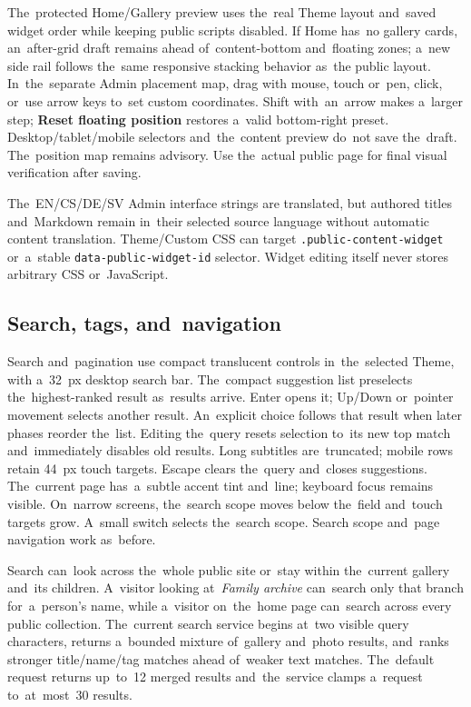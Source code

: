 \documentclass[11pt,a4paper]{article}
\newcommand{\ui}[1]{\textbf{#1}}
\begin{document}
The~protected Home/Gallery preview uses the~real Theme layout and~saved widget
order while keeping public scripts disabled. If Home has~no gallery cards,
an~after-grid draft remains ahead of~content-bottom and~floating zones; a~new
side rail follows the~same responsive stacking behavior as~the public layout.
In~the~separate Admin placement map, drag with mouse, touch or~pen, click,
or~use arrow keys to~set custom coordinates. Shift with~an~arrow makes a~larger
step; \ui{Reset floating position} restores a~valid bottom-right preset.
Desktop/tablet/mobile selectors and~the~content preview do~not save the~draft.
The~position map remains advisory. Use the~actual public page for final visual
verification after saving.

The~EN/CS/DE/SV Admin interface strings are translated, but authored titles
and~Markdown remain in~their selected source language without automatic content
translation. Theme/Custom CSS can target \texttt{.public-content-widget}
or~a~stable \texttt{data-public-widget-id} selector. Widget editing itself never
stores arbitrary CSS or~JavaScript.


\subsection{Search, tags, and~navigation}

Search and~pagination use compact translucent controls in~the~selected Theme,
with a~32~px desktop search bar.
The~compact suggestion list preselects the~highest-ranked result as~results
arrive. Enter opens it; Up/Down or~pointer movement selects another result.
An~explicit choice follows that result when later phases reorder the~list.
Editing the~query resets selection to~its new top match and~immediately
disables old results. Long subtitles are~truncated; mobile rows retain
44~px touch targets. Escape clears the~query and~closes suggestions.
The~current page has~a~subtle accent tint and~line; keyboard focus remains
visible. On~narrow screens, the~search scope moves below the~field and~touch
targets grow. A~small switch selects the~search scope. Search scope and~page
navigation work as~before.

Search can~look across the~whole public site or~stay within the~current gallery
and~its children. A~visitor looking at~\emph{Family archive} can~search only
that branch for~a~person's name, while a~visitor on~the~home page can~search
across every public collection. The~current search service begins at~two visible
query characters, returns a~bounded mixture of~gallery and~photo results,
and~ranks stronger title/name/tag matches ahead of~weaker text matches.
The~default request returns up~to~12 merged results and~the~service clamps
a~request to~at~most~30 results.
\end{document}
